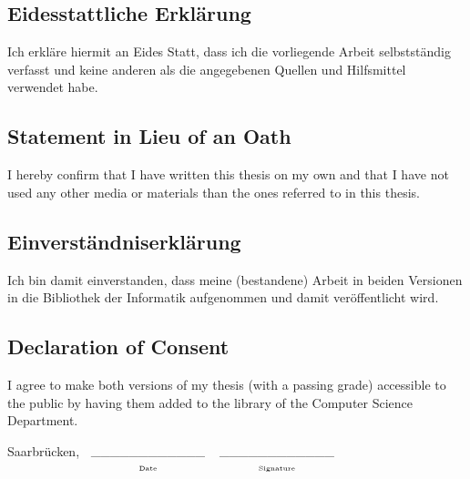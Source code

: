 \begin{minipage}[t][0.97\textheight]{1\columnwidth}%
    \null
    \vfill
    \subsection*{Eidesstattliche Erkl\"arung}

    Ich erkl\"are hiermit an Eides Statt, dass ich die vorliegende Arbeit
    selbstst\"andig verfasst und keine anderen als die angegebenen Quellen
    und Hilfsmittel verwendet habe. 


    \subsection*{Statement in Lieu of an Oath }

    I hereby confirm that I have written this thesis on my own and that
    I have not used any other media or materials than the ones referred
    to in this thesis. 

    \vspace{2cm}



    \subsection*{Einverst\"andniserkl\"arung }

    Ich bin damit einverstanden, dass meine (bestandene) Arbeit in beiden
    Versionen in die Bibliothek der Informatik aufgenommen und damit ver\"offentlicht
    wird. 


    \subsection*{Declaration of Consent }

    I agree to make both versions of my thesis (with a passing grade)
    accessible to the public by having them added to the library of the
    Computer Science Department. 

    \vspace{3cm}


    Saarbr\"ucken, $\begin{array}[t]{c}
        \text{\_\_\_\_\_\_\_\_\_\_\_\_}\\
        {\scriptscriptstyle \text{Date}}
    \end{array}$\hfill{$\begin{array}[t]{c}
        \_\_\_\_\_\_\_\_\_\_\_\_\\
        {\scriptscriptstyle \text{Signature}}
    \end{array}$\hfill}\end{minipage}

